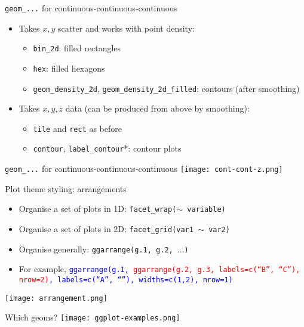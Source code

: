 \documentclass[10pt]{beamer}
\begin{document}
\begin{frame}{\texttt{geom\_...} for continuous-continuous-continuous}
  \begin{itemize}
  \item Takes $x,y$ scatter and works with point density:
    \begin{itemize}
                     \item \texttt{bin\_2d}: filled rectangles
                     \item \texttt{hex}: filled hexagons
                       \item \texttt{geom\_density\_2d}, \texttt{geom\_density\_2d\_filled}: contours (after smoothing)
    \end{itemize}
  \item Takes $x,y,z$ data (can be produced from above by smoothing):
    \begin{itemize}
      \item \texttt{tile} and \texttt{rect} as before
                 \item \texttt{contour}, \texttt{label\_contour}*: contour plots
    \end{itemize}
    \end{itemize}
\end{frame}

\begin{frame}{\texttt{geom\_...} for continuous-continuous-continuous}
  \texttt{[image: cont-cont-z.png]}
\end{frame}

\begin{frame}{Plot theme styling: arrangements}
    \begin{itemize}
    \item Organise a set of plots in 1D: \texttt{facet\_wrap($\sim$ variable)}
      \item Organise a set of plots in 2D: \texttt{facet\_grid(var1 $\sim$ var2)}
      \item Organise generally: \texttt{ggarrange(g.1, g.2, }...\texttt{)}
        \item For example, \texttt{\textcolor{blue}{ggarrange(g.1, }\textcolor{red}{ggarrange(g.2, g.3, labels=c(``B'', ``C''), nrow=2)}\textcolor{blue}{, labels=c(``A'', ``''), widths=c(1,2), nrow=1)}}
    \end{itemize}
    \texttt{[image: arrangement.png]}
\end{frame}

\begin{frame}{Which geoms?}
  \texttt{[image: ggplot-examples.png]}
  \end{frame}
\end{document}
